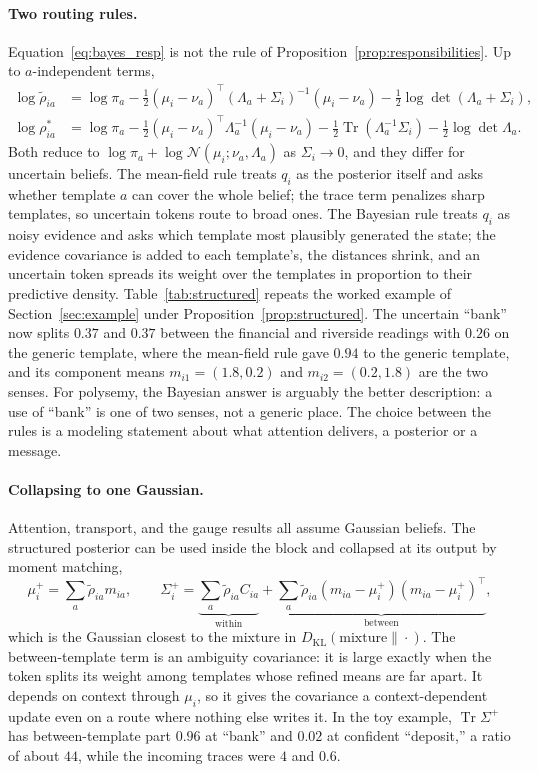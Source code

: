 \documentclass[11pt]{article}
\theoremstyle{definition}
\theoremstyle{remark}
\newcommand{\KL}{D_{\mathrm{KL}}}
\newcommand{\Tr}{\operatorname{Tr}}
\newcommand{\N}{\mathcal{N}}
\begin{document}
\paragraph{Two routing rules.}
Equation~\eqref{eq:bayes_resp} is not the rule of Proposition~\ref{prop:responsibilities}. Up to $a$-independent terms,
\begin{align*}
\log\tilde\rho_{ia}&=\log\pi_a-\tfrac12(\mu_i-\nu_a)^{\top}(\Lambda_a+\Sigma_i)^{-1}(\mu_i-\nu_a)-\tfrac12\log\det(\Lambda_a+\Sigma_i),\\
\log\rho^{*}_{ia}&=\log\pi_a-\tfrac12(\mu_i-\nu_a)^{\top}\Lambda_a^{-1}(\mu_i-\nu_a)-\tfrac12\Tr(\Lambda_a^{-1}\Sigma_i)-\tfrac12\log\det\Lambda_a.
\end{align*}
Both reduce to $\log\pi_a+\log\N(\mu_i;\nu_a,\Lambda_a)$ as $\Sigma_i\to0$, and they differ for uncertain beliefs. The mean-field rule treats $q_i$ as the posterior itself and asks whether template $a$ can cover the whole belief; the trace term penalizes sharp templates, so uncertain tokens route to broad ones. The Bayesian rule treats $q_i$ as noisy evidence and asks which template most plausibly generated the state; the evidence covariance is added to each template's, the distances shrink, and an uncertain token spreads its weight over the templates in proportion to their predictive density. Table~\ref{tab:structured} repeats the worked example of Section~\ref{sec:example} under Proposition~\ref{prop:structured}. The uncertain ``bank'' now splits $0.37$ and $0.37$ between the financial and riverside readings with $0.26$ on the generic template, where the mean-field rule gave $0.94$ to the generic template, and its component means $m_{i1}=(1.8,0.2)$ and $m_{i2}=(0.2,1.8)$ are the two senses. For polysemy, the Bayesian answer is arguably the better description: a use of ``bank'' is one of two senses, not a generic place. The choice between the rules is a modeling statement about what attention delivers, a posterior or a message.

\paragraph{Collapsing to one Gaussian.}
Attention, transport, and the gauge results all assume Gaussian beliefs. The structured posterior can be used inside the block and collapsed at its output by moment matching,
\begin{equation}
\mu_i^{+}=\sum_a\tilde\rho_{ia}m_{ia},
\qquad
\Sigma_i^{+}=\underbrace{\sum_a\tilde\rho_{ia}C_{ia}}_{\text{within}}
+\underbrace{\sum_a\tilde\rho_{ia}(m_{ia}-\mu_i^{+})(m_{ia}-\mu_i^{+})^{\top}}_{\text{between}},
\label{eq:collapse}
\end{equation}
which is the Gaussian closest to the mixture in $\KL(\text{mixture}\|\cdot)$. The between-template term is an ambiguity covariance: it is large exactly when the token splits its weight among templates whose refined means are far apart. It depends on context through $\mu_i$, so it gives the covariance a context-dependent update even on a route where nothing else writes it. In the toy example, $\Tr\Sigma^{+}$ has between-template part $0.96$ at ``bank'' and $0.02$ at confident ``deposit,'' a ratio of about $44$, while the incoming traces were $4$ and $0.6$.
\end{document}
